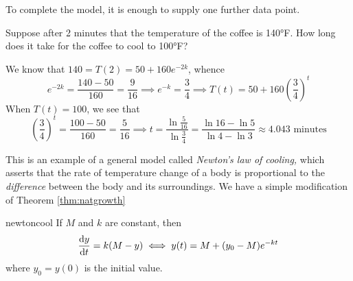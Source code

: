 To complete the model, it is enough to supply one further data point.\par

Suppose after 2 minutes that the temperature of the coffee is \ang{140}F. How long does it take for the coffee to cool to \ang{100}F?\smallbreak

We know that $140=T(2)=50+160e^{-2k}$, whence
\[e^{-2k}=\frac{140-50}{160}=\frac 9{16}\implies e^{-k}=\frac 34\implies T(t)=50+160\left(\frac 34\right)^t\]
When $T(t)=100$, we see that
\[\left(\frac 34\right)^t=\frac{100-50}{160}=\frac 5{16}\implies t=\frac{\ln\frac 5{16}}{\ln\frac 34} =\frac{\ln 16-\ln 5}{\ln 4-\ln 3}\approx 4.043\text{ minutes}\]


\goodbreak

This is an example of a general model called \emph{Newton's law of cooling,} which asserts that the rate of temperature change of a body is proportional to the \emph{difference} between the body and its surroundings. We have a simple modification of Theorem \ref{thm:natgrowth}

\begin{cor}{}{newtoncool}
If $M$ and $k$ are constant, then
\[\diff[y]{t}=k(M-y)\iff y(t)=M+(y_0-M)e^{-kt}\]
where $y_0=y(0)$ is the initial value.
\end{cor}




